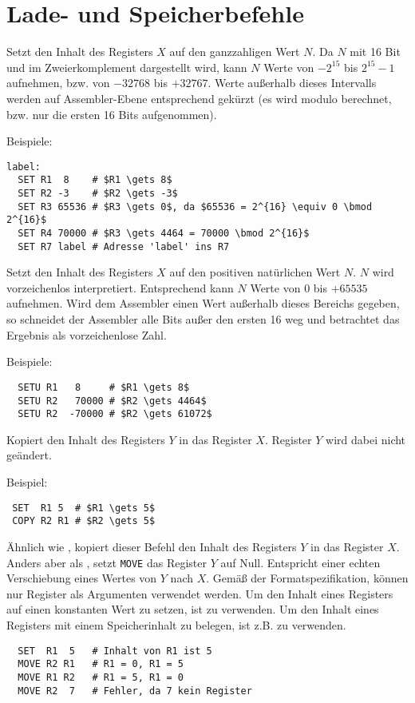 \section{Lade- und Speicherbefehle}
\label{sec:Lade-Speicher-Instruktionen}

Setzt den Inhalt des Registers $X$ auf den ganzzahligen Wert $N$.
Da $N$ mit 16 Bit und im Zweierkomplement dargestellt wird, kann $N$ Werte von
$-2^{15}$ bis $2^{15} - 1$ aufnehmen, bzw. von $-32768$ bis $+32767$.
Werte außerhalb dieses Intervalls werden auf Assembler-Ebene entsprechend
gekürzt (es wird modulo berechnet, bzw. nur die ersten 16 Bits aufgenommen).

Beispiele:
\begin{lstlisting}
label:
  SET R1  8    # $R1 \gets 8$
  SET R2 -3    # $R2 \gets -3$
  SET R3 65536 # $R3 \gets 0$, da $65536 = 2^{16} \equiv 0 \bmod 2^{16}$
  SET R4 70000 # $R3 \gets 4464 = 70000 \bmod 2^{16}$
  SET R7 label # Adresse 'label' ins R7
\end{lstlisting}


Setzt den Inhalt des Registers $X$ auf den positiven natürlichen Wert $N$.
$N$ wird vorzeichenlos interpretiert. Entsprechend kann $N$ Werte von $0$ bis
$+65535$ aufnehmen.
Wird dem Assembler einen Wert außerhalb dieses Bereichs gegeben, so
schneidet der Assembler alle Bits außer den ersten 16 weg und betrachtet das
Ergebnis als vorzeichenlose Zahl.

Beispiele:
\begin{lstlisting}
  SETU R1   8     # $R1 \gets 8$
  SETU R2   70000 # $R2 \gets 4464$
  SETU R2  -70000 # $R2 \gets 61072$
\end{lstlisting}


Kopiert den Inhalt des Registers $Y$ in das Register $X$. Register $Y$ wird
dabei nicht geändert.

Beispiel:
\begin{lstlisting}
 SET  R1 5  # $R1 \gets 5$
 COPY R2 R1 # $R2 \gets 5$
\end{lstlisting}



Ähnlich wie , kopiert dieser Befehl den Inhalt des Registers $Y$
in das Register $X$.
Anders aber als , setzt \texttt{MOVE} das Register $Y$ auf Null.
Entspricht einer echten Verschiebung eines Wertes von $Y$ nach $X$.
Gemäß der Formatspezifikation, können nur Register als Argumenten verwendet
werden. Um den Inhalt eines Registers auf einen konstanten Wert zu setzen, ist
 zu verwenden. Um den Inhalt eines Registers mit einem Speicherinhalt
zu belegen, ist z.B.  zu verwenden.
\begin{lstlisting}
  SET  R1  5   # Inhalt von R1 ist 5
  MOVE R2 R1   # R1 = 0, R1 = 5
  MOVE R1 R2   # R1 = 5, R1 = 0
  MOVE R2  7   # Fehler, da 7 kein Register
\end{lstlisting}




